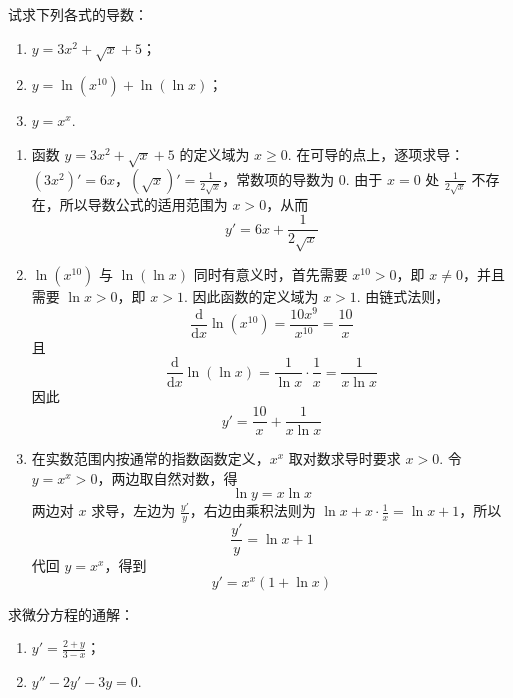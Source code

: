 \begin{problem}
试求下列各式的导数：

\begin{enumerate}
\item \(y=3x^2+\sqrt{x}+5\)；
\item \(y=\ln\left(x^{10}\right)+\ln\left(\ln x\right)\)；
\item \(y=x^x\).
\end{enumerate}
\end{problem}

\begin{solution}
\begin{enumerate}
\item 函数 \(y=3x^2+\sqrt{x}+5\) 的定义域为 \(x\geqslant0\). 在可导的点上，逐项求导：\(\left(3x^2\right)'=6x\)，\(\left(\sqrt{x}\right)'=\frac{1}{2\sqrt{x}}\)，常数项的导数为 \(0\). 由于 \(x=0\) 处 \(\frac{1}{2\sqrt{x}}\) 不存在，所以导数公式的适用范围为 \(x>0\)，从而
\[
y'=6x+\frac{1}{2\sqrt{x}}
\]

\item \(\ln\left(x^{10}\right)\) 与 \(\ln\left(\ln x\right)\) 同时有意义时，首先需要 \(x^{10}>0\)，即 \(x\ne0\)，并且需要 \(\ln x>0\)，即 \(x>1\). 因此函数的定义域为 \(x>1\). 由链式法则，
\[
\frac{\mathrm{d}}{\mathrm{d}x}\ln\left(x^{10}\right)=\frac{10x^9}{x^{10}}=\frac{10}{x}
\]
且
\[
\frac{\mathrm{d}}{\mathrm{d}x}\ln\left(\ln x\right)=\frac{1}{\ln x}\cdot\frac{1}{x}=\frac{1}{x\ln x}
\]
因此
\[
y'=\frac{10}{x}+\frac{1}{x\ln x}
\]

\item 在实数范围内按通常的指数函数定义，\(x^x\) 取对数求导时要求 \(x>0\). 令 \(y=x^x>0\)，两边取自然对数，得
\[
\ln y=x\ln x
\]
两边对 \(x\) 求导，左边为 \(\frac{y'}{y}\)，右边由乘积法则为 \(\ln x+x\cdot\frac1x=\ln x+1\)，所以
\[
\frac{y'}{y}=\ln x+1
\]
代回 \(y=x^x\)，得到
\[
y'=x^x\left(1+\ln x\right)
\]
\end{enumerate}
\end{solution}

\begin{problem}
求微分方程的通解：

\begin{enumerate}
\item \(y'=\frac{2+y}{3-x}\)；
\item \(y''-2y'-3y=0\).
\end{enumerate}
\end{problem}


